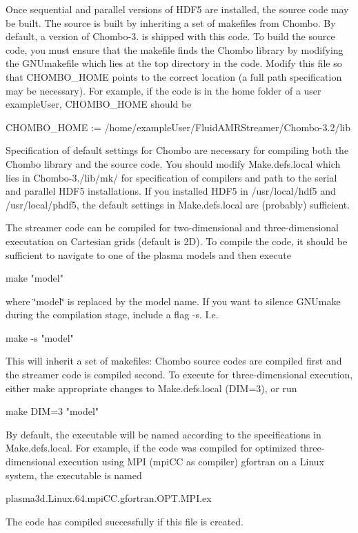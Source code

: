 Once sequential and parallel versions of H\+D\+F5 are installed, the source code may be built. The source is built by inheriting a set of makefiles from Chombo. By default, a version of Chombo-\/3. is shipped with this code. To build the source code, you must ensure that the makefile finds the Chombo library by modifying the G\+N\+Umakefile which lies at the top directory in the code. Modify this file so that {\ttfamily C\+H\+O\+M\+B\+O\+\_\+\+H\+O\+ME} points to the correct location (a full path specification may be necessary). For example, if the code is in the home folder of a user {\ttfamily example\+User}, {\ttfamily C\+H\+O\+M\+B\+O\+\_\+\+H\+O\+ME} should be \begin{DoxyVerb}CHOMBO_HOME := /home/exampleUser/FluidAMRStreamer/Chombo-3.2/lib
\end{DoxyVerb}


Specification of default settings for Chombo are necessary for compiling both the Chombo library and the source code. You should modify Make.\+defs.\+local which lies in Chombo-\/3./lib/mk/ for specification of compilers and path to the serial and parallel H\+D\+F5 installations. If you installed H\+D\+F5 in /usr/local/hdf5 and /usr/local/phdf5, the default settings in Make.\+defs.\+local are (probably) sufficient.

The streamer code can be compiled for two-\/dimensional and three-\/dimensional executation on Cartesian grids (default is 2D). To compile the code, it should be sufficient to navigate to one of the plasma models and then execute \begin{DoxyVerb}make "model"
\end{DoxyVerb}


where \char`\"{}model\char`\"{} is replaced by the model name. If you want to silence G\+N\+Umake during the compilation stage, include a flag -\/s. I.\+e. \begin{DoxyVerb}make -s "model"
\end{DoxyVerb}


This will inherit a set of makefiles\+: Chombo source codes are compiled first and the streamer code is compiled second. To execute for three-\/dimensional execution, either make appropriate changes to Make.\+defs.\+local (D\+IM=3), or run \begin{DoxyVerb}make DIM=3 "model"
\end{DoxyVerb}


By default, the executable will be named according to the specifications in Make.\+defs.\+local. For example, if the code was compiled for optimized three-\/dimensional execution using M\+PI (mpi\+CC as compiler) gfortran on a Linux system, the executable is named \begin{DoxyVerb}plasma3d.Linux.64.mpiCC.gfortran.OPT.MPI.ex
\end{DoxyVerb}


The code has compiled successfully if this file is created. 